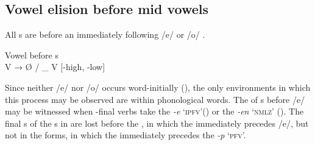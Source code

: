 
\subsection{Vowel elision before mid vowels}\label{sec:2.5.4}


All s are  before an immediately following /e/ or /o/ .

\ea%
    \label{ex:phon:70}
          Vowel  before s\\
    V → Ø / \_ V [-high, -low]
\z

Since neither /e/ nor /o/ occurs word-initially (), the only environments in which this process may be observed are within phonological words. The  of s before /e/ may be witnessed when -final verbs take the   \textit{-e} ‘\textsc{ipfv}’() or the  \textit{-en} ‘\textsc{nmlz}’ (). The final s of the s in  are lost before the  , in which the  immediately precedes /e/, but not in the  forms, in which the  immediately precedes the  \textit{-p} ‘\textsc{pfv}’.

